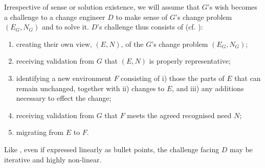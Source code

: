 \documentclass[runningheads,a4paper]{llncs}
\begin{document}
Irrespective of sense or solution existence, we will assume that $G$'s wish becomes a challenge to a change engineer $D$ to make sense of $G$'s change problem $(E_G,N_G)$ and to solve it. $D$'s challenge thus consists of (cf. \cite{hall2016a-design}):
%
\begin{enumerate}[label=CPS\arabic*.]
	\item creating their own view, $(E, N)$, of the $G$'s change problem $(E_G, N_G)$;
	\item receiving validation from $G$ that $(E, N)$ is properly representative;
	\item identifying a new environment $F$ consisting of i) those the parts of $E$ that can remain unchanged, together with ii) changes to $E$, and iii) any additions necessary to effect the change;
	\item receiving validation from $G$ that $F$ meets the agreed recognised need $N$;
	\item migrating from $E$ to $F$.
\end{enumerate}

Like \POE{} \cite{hall2016a-design}, even if expressed linearly as bullet points, the challenge facing $D$ may be iterative and highly non-linear.

\newcommand\CM{Pixel}
\def\ColourMaker#{\textit{ColourMaker} (shortly \textit{CoMa})\gdef\ColourMaker{\textit{CoMa}}}
\newcommand{\code}[1]{\texttt{#1}}
\newcommand{\solved}{\relax}
\newcommand{\replacedBy}{\triangleright}
\newcommand{\Java}{Swift}
\end{document}
